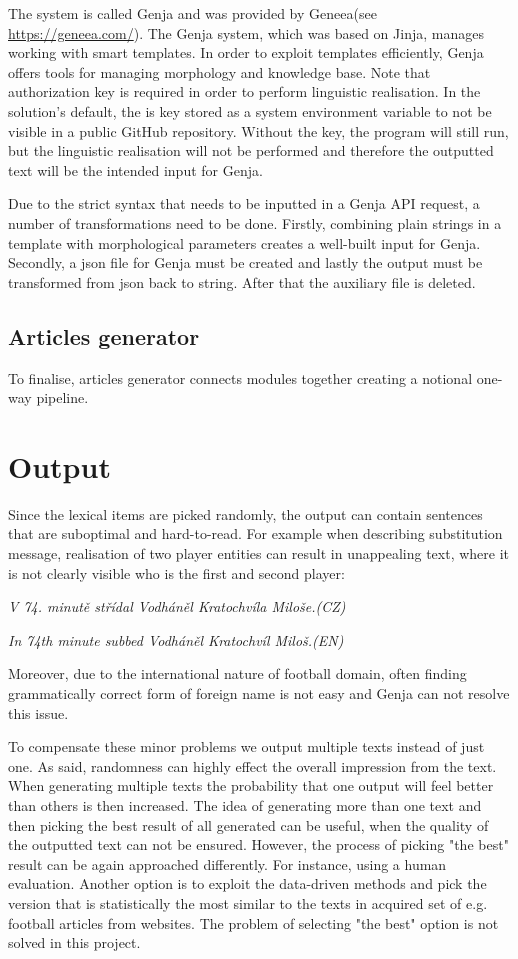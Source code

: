 The system is called Genja and was provided by Geneea(see \url{https://geneea.com/}). The Genja system, which was based on Jinja, manages working with smart templates. In order to exploit templates efficiently, Genja offers tools for managing morphology and knowledge base. Note that authorization key is required in order to perform linguistic realisation. In the solution's default, the is key stored as a system environment variable to not be visible in a public GitHub repository. Without the key, the program will still run, but the linguistic realisation will not be performed and therefore the outputted text will be the intended input for Genja.

Due to the strict syntax that needs to be inputted in a Genja API request, a number of transformations need to be done. Firstly, combining plain strings in a template with morphological parameters creates a well-built input for Genja. Secondly, a json file for Genja must be created and lastly the output must be transformed from json back to string. After that the auxiliary file is deleted.

\subsection{Articles generator}
To finalise, articles generator connects modules together creating a notional one-way pipeline. 

\section{Output}
Since the lexical items are picked randomly, the output can contain sentences that are suboptimal and hard-to-read. For example when describing substitution message, realisation of two player entities can result in unappealing text, where it is not clearly visible who is the first and second player:
\begin{center}
	\textit{V 74. minutě střídal Vodháněl Kratochvíla Miloše.(CZ)}
\end{center}
\begin{center}
	\textit{In 74th minute subbed Vodháněl Kratochvíl Miloš.(EN)}
\end{center}
Moreover, due to the international nature of football domain, often finding grammatically correct form of foreign name is not easy and Genja can not resolve this issue. 

To compensate these minor problems we output multiple texts instead of just one. As said, randomness can highly effect the overall impression from the text. When generating multiple texts the probability that one output will feel better than others is then increased. The idea of generating more than one text and then picking the best result of all generated can be useful, when the quality of the outputted text can not be ensured. However, the process of picking "the best" result can be again approached differently. For instance, using a human evaluation. Another option is to exploit the data-driven methods and pick the version that is statistically the most similar to the texts in acquired set of e.g. football articles from websites. The problem of selecting "the best" option is not solved in this project. 

